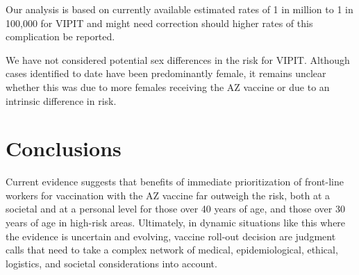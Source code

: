 \documentclass[]{interact}
\theoremstyle{plain}%
\theoremstyle{definition}
\theoremstyle{remark}
\begin{document}
Our analysis is based on currently available estimated rates of 1 in
million to 1 in 100,000 for VIPIT and might need correction should
higher rates of this complication be reported.

We have not considered potential sex differences in the risk for VIPIT.
Although cases identified to date have been predominantly female, it
remains unclear whether this was due to more females receiving the AZ
vaccine or due to an intrinsic difference in risk.

\hypertarget{conclusions}{%
\section{Conclusions}\label{conclusions}}

Current evidence suggests that benefits of immediate prioritization of
front-line workers for vaccination with the AZ vaccine far outweigh the
risk, both at a societal and at a personal level for those over 40 years
of age, and those over 30 years of age in high-risk areas. Ultimately,
in dynamic situations like this where the evidence is uncertain and
evolving, vaccine roll-out decision are judgment calls that need to take
a complex network of medical, epidemiological, ethical, logistics, and
societal considerations into account.



\end{document}
